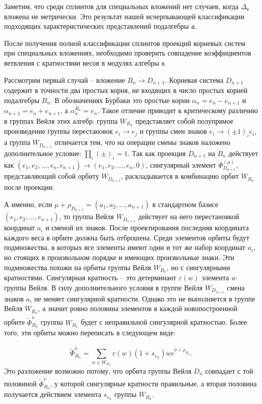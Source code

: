 \documentclass[12pt]{article}
\newcommand{\af}{\mathfrak{a}}
\newcommand{\sfr}{\mathfrak{s}}
\begin{document}
Заметим, что среди сплинтов для специальных вложений нет случаев, когда $\Delta_{\sfr}$ вложена не
метрически. Это результат нашей исчерпывающей классификации подходящих характеристических
представлений подалгебры $\af$.

После получения полной классификации сплинтов проекций корневых систем при специальных вложениях,
необходимо проверить совпадение коэффициентов ветвления с кратностями весов в модулях алгебры $\sfr$.

Рассмотрим первый случай -- вложение $B_{n}\to D_{n+1}$. Корневая система $D_{n+1}$ содержит в
точности два простых корня, не входящих в число простых корней подалгебры $B_{n}$. В обозначениях Бурбаки
\cite{bourbaki2002lie} это простые корни $\alpha_{n}=e_n-e_{n+1}$ и $\alpha_{n+1}=e_n+e_{n+1}$, а
$\alpha_n^{B_n}=e_n$. Такое отличие приводит к критическому различию в группах Вейля этих алгебр:
группа $W_{B_{n}}$ представляет собой полупрямое произведение группы перестановок $e_{i} \to e_{j}$
и группы смен знаков $e_{i}\to (\pm 1)_{i}e_{i}$, а группа $W_{D_{n+1}}$ отличается тем, что на
операции смены знаков наложено дополнительное условие: $\prod_{i} (\pm)_{i}=1.$ Так как проекция
$D_{n+1}$ на $B_{n}$ действует как
$(e_1,e_2,\dots,e_{n},e_{n+1})\to(e_1,e_2,\dots,e_{n},0)$, сингулярный элемент
$\Phi^{(\mu)}_{D_{n+1}}$, представляющий собой орбиту $W_{D_{n+1}}$, раскладывается в комбинацию
орбит  $W_{B_{n}}$ после проекции.

А именно, если $\mu+\rho_{D_{n+1}}=(a_1,a_2,\dots,a_{n+1})$ в стандартном базисе
$(e_1,e_2,\dots,e_{n+1})$, то группа Вейля $W_{D_{n+1}}$ действует на него перестановкой координат
$a_i$ и сменой их знаков. После проектирования последняя координата каждого веса в орбите должна быть
отброшена. Среди элементов орбиты будут подмножества, в которых все элементы имеют один и тот же
набор координат $a_i$, но стоящих в произвольном порядке и имеющих произвольные знаки. Эти
подмножества похожи на орбиты группы Вейля $W_{B_{n}}$, но с сингулярными кратностями. Сингулярная
кратность -- это детерминант
$\varepsilon (w)$ элемента  $w$ группы Вейля. В силу дополнительного условия в группе Вейля
$W_{D_{n+1}}$ смена знаков  $a_i$ не меняет сингулярной кратности. Однако это не выполняется в
группе Вейля $W_{B_{n}}$, а значит ровно половина элементов в каждой новопостроенной орбите
$\tilde\Phi^{\tilde\nu}_{B_n}$ группы $W_{B_{n}}$ будет с неправильной сингулярной кратностью. Более
того, эти орбиты можно переписать в следующем виде:

\begin{equation}
\tilde\Phi^{\tilde\nu}_{B_n}=\sum_{w\in W_{D_n}} \varepsilon(w) (1+s_{e_n})w e^{\tilde\nu+\rho_{B_n}}.
\end{equation}
Это разложение возможно потому, что орбита группы Вейля $D_n$ совпадает с той половиной
$\tilde\Phi^{\tilde\nu}_{B_n}$, у которой сингулярные кратности правильные, а вторая половина
получается действием элемента $s_{e_n}$ группы $W_{B_{n}}$.
\end{document}
